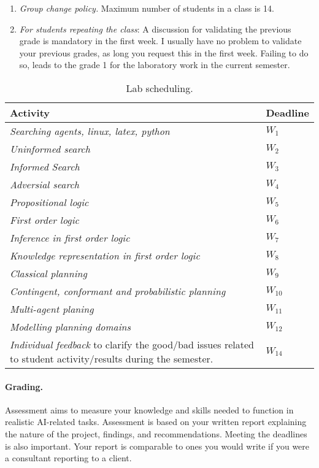\begin{enumerate}
\item {\it Group change policy.} Maximum number of students in a class is 14.

\item {\it For students repeating the class}: A discussion for validating the previous grade is mandatory in the first week. I usually have no problem to validate your previous grades, as long you request this in the first week. 
Failing to do so, leads to the grade 1 for the laboratory work in the current semester.


\end{enumerate}




\begin{table}
\begin{center}
\caption{Lab scheduling.}
\begin{tabular}{|p{11cm}|p{1.7cm}|}\hline
\textbf{Activity} & \textbf{Deadline}  \\ \hline
{\it Searching agents, linux, latex, python}  & $W_1$ \\ \hline
{\it Uninformed search} & $W_2$  \\ \hline
{\it Informed Search} & $W_3$  \\ \hline
{\it Adversial search} & $W_4$ \\ \hline
{\it Propositional logic} & $W_5$ \\ \hline
{\it First order logic} & $W_6$ \\ \hline
{\it Inference in first order logic} & $W_7$ \\ \hline
{\it Knowledge representation in first order logic} & $W_8$ \\ \hline
{\it Classical planning} & $W_9$ \\ \hline
{\it Contingent, conformant and probabilistic planning} & $W_{10}$ \\ \hline
{\it Multi-agent planing} & $W_{11}$ \\ \hline
{\it Modelling planning domains} & $W_{12}$ \\ \hline
{\it Individual feedback} to clarify the good/bad issues related to student activity/results during the semester. & $W_{14}$ \\ \hline 
\end{tabular}
\end{center}
\label{tab:first}
\end{table}

\paragraph{Grading.}
Assessment aims to measure your knowledge and skills needed to function in realistic AI-related tasks.
Assessment is based on your written report explaining the nature of the project, findings, and recommendations. 
Meeting the deadlines is also important.
Your report is comparable to ones you would write if you were a consultant reporting to a client.

